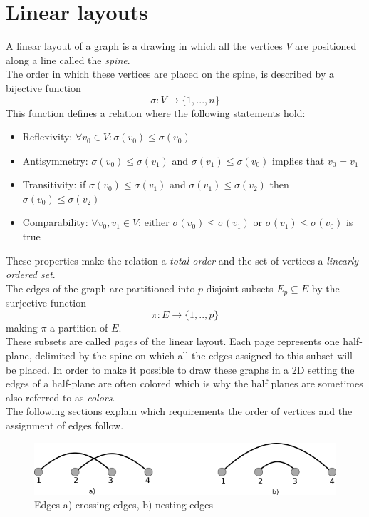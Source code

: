 \section{Linear layouts}
\label{LL}
A linear layout of a graph is a drawing in which all the vertices $V$ are positioned along a line called the \textit{spine}.\\
The order in which these vertices are placed on the spine, is described by a bijective function $$\sigma : V \mapsto \{1,...,n\} $$ This function defines a relation where the following statements hold:
\begin{itemize}
\item Reflexivity: $\forall v_0 \in V: \sigma(v_0) \leq \sigma(v_0)$
\item Antisymmetry: $\sigma(v_0) \leq \sigma(v_1)$ and $\sigma(v_1) \leq \sigma(v_0)$ implies that $v_0 = v_1$
\item Transitivity: if $\sigma(v_0) \leq \sigma(v_1)$ and $\sigma(v_1) \leq \sigma(v_2)$ then $\sigma(v_0) \leq \sigma(v_2)$
\item Comparability: $\forall v_0, v_1 \in V$: either $\sigma(v_0) \leq \sigma(v_1)$ or $\sigma(v_1) \leq \sigma(v_0)$ is true
\end{itemize}
These properties make the relation a \textit{total order}  and the set of vertices a \textit{linearly ordered set}.\\
The edges of the graph are partitioned into $p$ disjoint subsets $E_p \subseteq E$ by the surjective function 
$$ \pi: E \rightarrow \{1,..,p\} $$ making $\pi$ a partition of $E$.\\
These subsets are called \textit{pages} of the linear layout. Each page represents one half-plane, delimited by the spine on which all the edges assigned to this subset will be placed.
In order to make it possible to draw these graphs in a 2D setting the edges of a half-plane are often colored which is why the half planes are sometimes also referred to as \textit{colors}.\\
The following sections explain which requirements the order of vertices and the assignment of edges follow.
\begin{figure}[!h]
\begin{center}
\includegraphics[width=1\textwidth]{figures/CrossingNesting.png}
\caption{Edges a) crossing edges, b) nesting edges}
\label{img:crossNest}
\end{center}
\end{figure}
